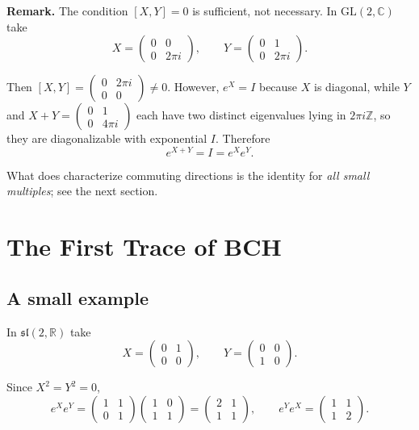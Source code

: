 \documentclass[11pt]{article}
\begin{document}
\textbf{Remark.} The condition $[X, Y] = 0$ is sufficient, not necessary. In $\mathrm{GL}(2, \mathbb{C})$ take
\[
X = \begin{pmatrix} 0 & 0 \\ 0 & 2\pi i \end{pmatrix}, \qquad Y = \begin{pmatrix} 0 & 1 \\ 0 & 2\pi i \end{pmatrix}.
\]

Then $[X, Y] = \begin{pmatrix} 0 & 2\pi i \\ 0 & 0 \end{pmatrix} \ne 0$. However, $e^X = I$ because $X$ is diagonal, while $Y$ and $X + Y = \begin{pmatrix} 0 & 1 \\ 0 & 4\pi i \end{pmatrix}$ each have two distinct eigenvalues lying in $2\pi i \mathbb{Z}$, so they are diagonalizable with exponential $I$. Therefore
\[
e^{X+Y} = I = e^X e^Y.
\]

What does characterize commuting directions is the identity for \emph{all small multiples}; see the next section.

\section{The First Trace of BCH}

\subsection{A small example}

In $\mathfrak{sl}(2, \mathbb{R})$ take
\[
X = \begin{pmatrix} 0 & 1 \\ 0 & 0 \end{pmatrix}, \qquad Y = \begin{pmatrix} 0 & 0 \\ 1 & 0 \end{pmatrix}.
\]

Since $X^2 = Y^2 = 0$,
\[
e^X e^Y = \begin{pmatrix} 1 & 1 \\ 0 & 1 \end{pmatrix} \begin{pmatrix} 1 & 0 \\ 1 & 1 \end{pmatrix} = \begin{pmatrix} 2 & 1 \\ 1 & 1 \end{pmatrix},
\qquad
e^Y e^X = \begin{pmatrix} 1 & 1 \\ 1 & 2 \end{pmatrix}.
\]
\end{document}
